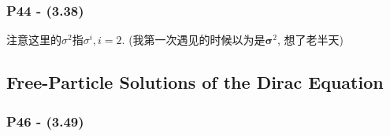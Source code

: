 \documentclass[cn,hazy,blue,11pt,device=normal,chinesefont=founder]{elegantnote}
\begin{document}
\subsubsection{P44 - (3.38)}

注意这里的$\sigma^2$指$\sigma^i, i=2$. (我第一次遇见的时候以为是$\boldsymbol{\sigma}^2$, 想了老半天)

\subsection{Free-Particle Solutions of the Dirac Equation}

\subsubsection{P46 - (3.49)}\label{subsubsec: Boost_u_p}
\end{document}
